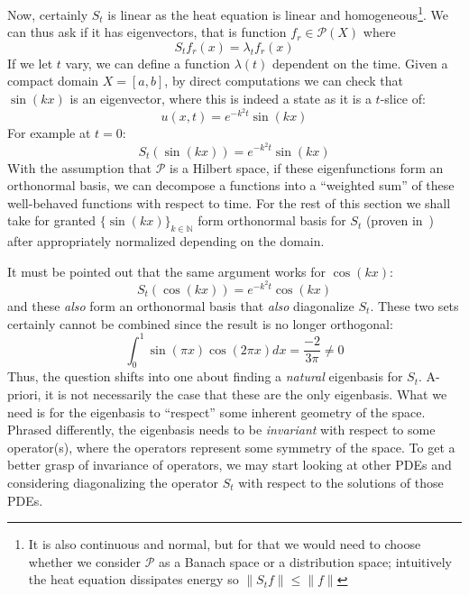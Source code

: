\documentclass{article}
\newcommand{\N}{{\mathbb{N}}}
\newcommand{\SP}{\mathscr{P}}
\begin{document}
Now, certainly $S_t$ is linear as the heat equation is linear and homogeneous\footnote{It is also continuous and
normal, but for that we would need to choose whether we consider $\SP$ as a Banach space or a distribution
space; intuitively the heat equation dissipates energy so $\|S_t f\| \le \|f\|$}. We can thus ask if it has
eigenvectors, that is function $f_r \in \SP(X)$ where
\[
	S_tf_r(x) = \lambda_t f_{r}(x)
\]
If we let $t$ vary, we can define a function $\lambda(t)$ dependent on the time. Given a compact domain $X
=[a,b]$, by direct computations we can check that $\sin(kx)$ is an eigenvector, where this is indeed a state
as it is a $t$-slice of:
\[
	u(x,t) = e^{-k^2 t} \sin(kx)
\]
For example at $t = 0$:
\[
S_t(\sin(kx)) = e^{-k^2 t} \sin(kx)
\]
With the assumption that $\SP$ is a Hilbert space, if these eigenfunctions form an orthonormal basis, we can
decompose a functions into a ``weighted sum'' of these well-behaved functions with respect to time. For the
rest of this section we shall take for granted $\{\sin(kx)\}_{k \in \N}$ form orthonormal basis for $S_t$
(proven in~\cite{NateRealAnalysis}) after appropriately normalized depending on the
domain.

It must be pointed out that the same argument works for $\cos(kx)$:
\[
S_t(\cos(kx)) = e^{-k^2 t} \cos(kx)
\]
and these \emph{also} form an orthonormal basis that \emph{also} diagonalize $S_t$. These two sets certainly
cannot be combined since the result is no longer orthogonal:
\[
	 \int_0^1 \sin(\pi x) \cos(2\pi x)  dx = \frac{-2}{3\pi} \ne 0
\]
Thus, the question shifts into one about finding a \emph{natural} eigenbasis for $S_t$. A-priori, it is not
necessarily the case that these are the only eigenbasis. What we need is for the eigenbasis to ``respect''
some inherent geometry of the space. Phrased differently, the eigenbasis needs to be \emph{invariant} with
respect to some operator(s), where the operators represent some symmetry of the space. To get a better grasp
of invariance of operators, we may start looking at other PDEs and considering diagonalizing the operator
$S_t$ with respect to the solutions of those PDEs.
\end{document}
